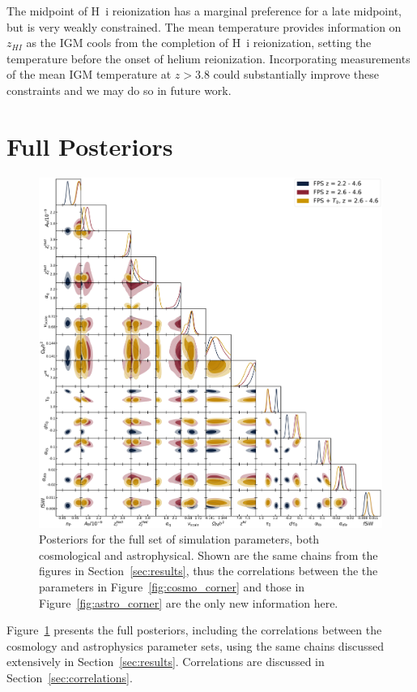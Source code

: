 The midpoint of H~{\sc i} reionization has a marginal preference for a late midpoint, but is very weakly constrained.
The mean temperature provides information on $z_{HI}$ as the IGM cools from the completion of H~{\sc i} reionization, setting the temperature before the onset of helium reionization. Incorporating measurements of the mean IGM temperature at $z > 3.8$  \cite[e.g.~][]{2023arXiv230402038G} could substantially improve these constraints and we may do so in future work.

\section{Full Posteriors}
\label{sec:full_posteriors}
\begin{figure}
    \centering
    \includegraphics[width=\textwidth]{figures/allp_corner.pdf}
    \caption{\label{fig:full_posterior}
    Posteriors for the full set of simulation parameters, both cosmological and astrophysical.
    Shown are the same chains from the figures in Section~\ref{sec:results}, thus the correlations between the the parameters in Figure~\ref{fig:cosmo_corner} and those in Figure~\ref{fig:astro_corner} are the only new information here.
    }
\end{figure}

Figure~\ref{fig:full_posterior} presents the full posteriors, including the correlations between the cosmology and astrophysics parameter sets, using the same chains discussed extensively in Section~\ref{sec:results}. Correlations are discussed in Section~\ref{sec:correlations}.

